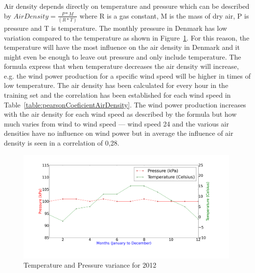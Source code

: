 Air density depends directly on temperature and pressure which can be described by $Air Density=\frac{P*M}{(R*T)}$ where R is a gas constant, M is the mass of dry air, P is pressure and T is temperature. The monthly pressure in Denmark has low variation compared to the temperature as shown in Figure~\ref{fig:pressureTemperatureVariance}. For this reason, the temperature will have the most influence on the air density in Denmark and it might even be enough to leave out pressure and only include temperature. The formula express that when temperature decreases the air density will increase, e.g. the wind power production for a specific wind speed will be higher in times of low temperature. The air density has been calculated for every hour in the training set and the correlation has been established for each wind speed in Table~\ref{table:pearsonCoeficientAirDensity}. The wind power production increases with the air density for each wind speed as described by the formula but how much varies from wind to wind speed --- wind speed 24 and the various air densities have no influence on wind power but in average the influence of air density is seen in a correlation of 0,28.

\begin{figure}[H]
\centering
\includegraphics[width=0.99\textwidth]{billeder/pressureTemperatureVariance.png}
\caption{Temperature and Pressure variance for 2012}
\label{fig:pressureTemperatureVariance}
\end{figure}

